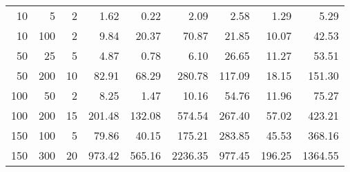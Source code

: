 \begin{tabular}{rrrrrrrrr}
\toprule
  10 &    5 &   2 &   1.62 &   0.22 &    2.09 &   2.58 &   1.29 &    5.29 \\
  10 &  100 &   2 &   9.84 &  20.37 &   70.87 &  21.85 &  10.07 &   42.53 \\
  50 &   25 &   5 &   4.87 &   0.78 &    6.10 &  26.65 &  11.27 &   53.51 \\
  50 &  200 &  10 &  82.91 &  68.29 &  280.78 & 117.09 &  18.15 &  151.30 \\
 100 &   50 &   2 &   8.25 &   1.47 &   10.16 &  54.76 &  11.96 &   75.27 \\
 100 &  200 &  15 & 201.48 & 132.08 &  574.54 & 267.40 &  57.02 &  423.21 \\
 150 &  100 &   5 &  79.86 &  40.15 &  175.21 & 283.85 &  45.53 &  368.16 \\
 150 &  300 &  20 & 973.42 & 565.16 & 2236.35 & 977.45 & 196.25 & 1364.55 \\
\bottomrule
\end{tabular}
